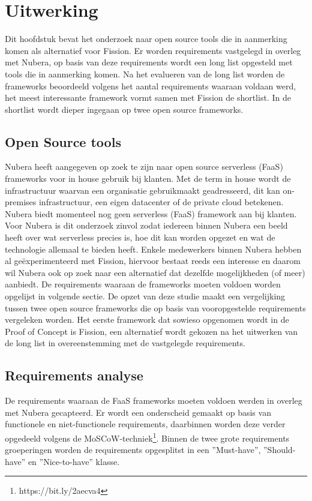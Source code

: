 \chapter{Uitwerking}
\label{ch:uitwerking}

Dit hoofdstuk bevat het onderzoek naar open source tools die in aanmerking komen als alternatief voor Fission. Er worden requirements vastgelegd in overleg met Nubera, op basis van deze requirements wordt een long list opgesteld met tools die in aanmerking komen. Na het evalueren van de long list worden de frameworks beoordeeld volgens het aantal requirements waaraan voldaan werd, het meest interessante framework vormt samen met Fission de shortlist. In de shortlist wordt dieper ingegaan op twee open source frameworks.

\section{Open Source tools}
Nubera heeft aangegeven op zoek te zijn naar open source serverless (FaaS) frameworks voor in house gebruik bij klanten. Met de term in house wordt de infrastructuur waarvan een organisatie gebruikmaakt geadresseerd, dit kan on-premises infrastructuur, een eigen datacenter of de private cloud betekenen. Nubera biedt momenteel nog geen serverless (FaaS) framework aan bij klanten. Voor Nubera is dit onderzoek zinvol zodat iedereen binnen Nubera een beeld heeft over wat serverless precies is, hoe dit kan worden opgezet en wat de technologie allemaal te bieden heeft. Enkele medewerkers binnen Nubera hebben al geëxperimenteerd met Fission, hiervoor bestaat reeds een interesse en daarom wil Nubera ook op zoek naar een alternatief dat dezelfde mogelijkheden (of meer) aanbiedt. De requirements waaraan de frameworks moeten voldoen worden opgelijst in volgende sectie. De opzet van deze studie maakt een vergelijking tussen twee open source frameworks die op basis van vooropgestelde requirements vergeleken worden. Het eerste framework dat sowieso opgenomen wordt in de Proof of Concept is Fission, een alternatief wordt gekozen na het uitwerken van de long list in overeenstemming met de vastgelegde requirements.

\section{Requirements analyse}
De requirements waaraan de FaaS frameworks moeten voldoen werden in overleg met Nubera gecapteerd. Er wordt een onderscheid gemaakt op basis van functionele en niet-functionele requirements, daarbinnen worden deze verder opgedeeld volgens de MoSCoW-techniek\footnote{https://bit.ly/2aecva4}. Binnen de twee grote requirements groeperingen worden de requirements opgesplitst in een ''Must-have'', ''Should-have'' en ''Nice-to-have'' klasse.

